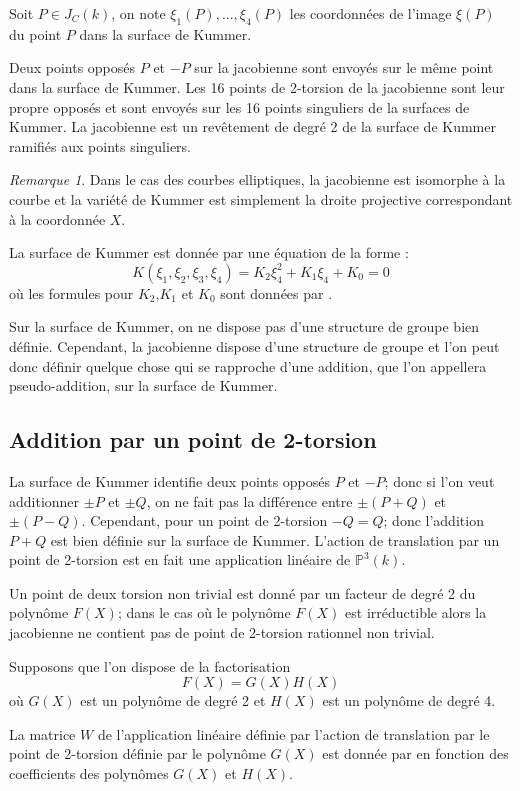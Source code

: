 \documentclass[a4paper]{article}
\theoremstyle{definition}
\theoremstyle{remark}
\newtheorem{remarque}{Remarque}
\numberwithin{equation}{section}
\begin{document}
Soit $P \in J_C(k)$, on note $\xi_1(P),...,\xi_4(P)$ les coordonnées de l'image $\xi(P)$ du point $P$ dans la surface de Kummer.

Deux points opposés $P$ et $-P$ sur la jacobienne sont envoyés sur le même point dans la surface de Kummer. Les 16 points de 2-torsion de la jacobienne sont leur propre opposés et sont envoyés sur les 16 points singuliers de la surfaces de Kummer. La jacobienne est un revêtement de degré 2 de la surface de Kummer ramifiés aux points singuliers.

\begin{remarque}
Dans le cas des courbes elliptiques, la jacobienne est isomorphe à la courbe et la variété de Kummer est simplement la droite projective correspondant à la coordonnée $X$.
\end{remarque}

La surface de Kummer est donnée par une équation de la forme :
$$K(\xi_1,\xi_2,\xi_3,\xi_4)=K_2\xi_4^2 + K_1\xi_4 + K_0 = 0$$
où les formules pour $K_2$,$K_1$ et $K_0$ sont données par \citet{eqKum}.

Sur la surface de Kummer, on ne dispose pas d'une structure de groupe bien définie. Cependant, la jacobienne dispose d'une structure de groupe et l'on peut donc définir quelque chose qui se rapproche d'une addition, que l'on appellera pseudo-addition, sur la surface de Kummer.

\subsection{Addition par un point de 2-torsion}
La surface de Kummer identifie deux points opposés $P$ et $-P$; donc si l'on veut additionner $\pm P$ et $\pm Q$, on ne fait pas la différence entre $\pm (P+Q)$ et $\pm (P-Q)$. Cependant, pour un point de 2-torsion $-Q=Q$; donc l'addition $P+Q$ est bien définie sur la surface de Kummer. L'action de translation par un point de 2-torsion est en fait une application linéaire de $\mathbb{P}^3(k)$.

Un point de deux torsion non trivial est donné par un facteur de degré 2 du polynôme $F(X)$; dans le cas où le polynôme $F(X)$ est irréductible alors la jacobienne ne contient pas de point de 2-torsion rationnel non trivial.

Supposons que l'on dispose de la factorisation
$$F(X) = G(X)H(X)$$
où $G(X)$ est un polynôme de degré 2 et $H(X)$ est un polynôme de degré 4.

La matrice $W$ de l'application linéaire définie par l'action de translation par le point de 2-torsion définie par le polynôme $G(X)$ est donnée par \citet{eqKum} en fonction des coefficients des polynômes $G(X)$ et $H(X)$.
\end{document}
